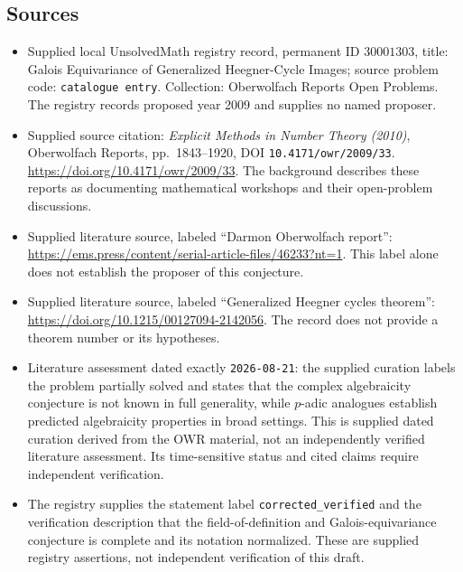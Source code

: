 \documentclass[11pt]{article}
\begin{document}
\subsection{Sources}
\begin{itemize}
\item Supplied local UnsolvedMath registry record, permanent ID \(30001303\), title: Galois Equivariance of Generalized Heegner-Cycle Images; source problem code: \texttt{catalogue entry}. Collection: Oberwolfach Reports Open Problems. The registry records proposed year 2009 and supplies no named proposer.
\item Supplied source citation: \emph{Explicit Methods in Number Theory (2010)}, Oberwolfach Reports, pp.\ 1843--1920, DOI \texttt{10.4171/owr/2009/33}. \url{https://doi.org/10.4171/owr/2009/33}. The background describes these reports as documenting mathematical workshops and their open-problem discussions.
\item Supplied literature source, labeled ``Darmon Oberwolfach report'': \url{https://ems.press/content/serial-article-files/46233?nt=1}. This label alone does not establish the proposer of this conjecture.
\item Supplied literature source, labeled ``Generalized Heegner cycles theorem'': \url{https://doi.org/10.1215/00127094-2142056}. The record does not provide a theorem number or its hypotheses.
\item Literature assessment dated exactly \texttt{2026-08-21}: the supplied curation labels the problem partially solved and states that the complex algebraicity conjecture is not known in full generality, while \(p\)-adic analogues establish predicted algebraicity properties in broad settings. This is supplied dated curation derived from the OWR material, not an independently verified literature assessment. Its time-sensitive status and cited claims require independent verification.
\item The registry supplies the statement label \texttt{corrected\_verified} and the verification description that the field-of-definition and Galois-equivariance conjecture is complete and its notation normalized. These are supplied registry assertions, not independent verification of this draft.
\end{itemize}
\end{document}
